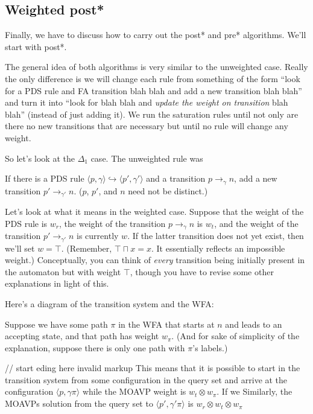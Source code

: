 \documentclass{article}
\newcommand{\Config}[2]{\ensuremath{\langle #1, #2 \rangle}}
\newcommand{\Rule}[2]{\ensuremath{#1 \hookrightarrow #2}}
\newcommand{\Trans}[3]{\ensuremath{#1 \rightarrow_{#2} #3}}
\newcommand{\meet}{\sqcap}
\newcommand{\extend}{\otimes}
\begin{document}
\subsection{Weighted post*}

Finally, we have to discuss how to carry out the post* and pre*
algorithms. We'll start with post*.

The general idea of both algorithms is very similar to the unweighted
case. Really the only difference is we will change each rule from
something of the form ``look for a PDS rule and FA transition blah
blah and add a new transition blah blah'' and turn it into ``look for
blah blah and \emph{update the weight on transition} blah blah''
(instead of just adding it). We run the saturation rules until not
only are there no new transitions that are necessary but until no rule
will change any weight.

So let's look at the $\Delta_1$ case. The unweighted rule was

   If there is a PDS rule
   \Rule{\Config{p}{\gamma}}{\Config{p'}{\gamma'}} and a transition
   \Trans{p}{\gamma}{n}, add a new transition
   \Trans{p'}{\gamma'}{n}. ($p$, $p'$, and $n$ need not be distinct.)

Let's look at what it means in the weighted case. Suppose that the
weight of the PDS rule is $w_r$, the weight of the transition
\Trans{p}{\gamma}{n} is $w_t$, and the weight of the transition
\Trans{p'}{\gamma'}{n} is currently $w$. If the latter transition does
not yet exist, then we'll set $w = \top$. (Remember, $\top \meet x =
x$. It essentially reflects an impossible weight.) Conceptually, you
can think of \emph{every} transition being initially present in the
automaton but with weight $\top$, though you have to revise some other
explanations in light of this.

Here's a diagram of the transition system and the WFA:

Suppose we have some path $\pi$ in the WFA that starts at $n$ and
leads to an accepting state, and that path has weight $w_\pi$. (And
for sake of simplicity of the explanation, suppose there is only one
path with $\pi$'s labels.)

// start eding here invalid markup
This means that it is possible to start in the transition system from some
  configuration in the query set and arrive at the configuration
  \Config{p}{\gamma \pi} while the MOAVP weight is $w_t \extend
  w_\pi$.\footnotemark
If we Similarly, the MOAVPs solution from the query set to
  \Config{p'}{\gamma'\pi} is $w_r \extend w_t \extend w_\pi$
\end{document}
